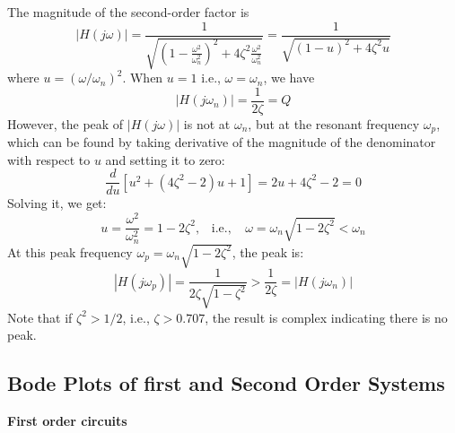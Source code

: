 \documentclass{article}
\begin{document}
  The magnitude of the second-order factor is
  \begin{equation}
    |H(j\omega)|
    =\frac{1}{\sqrt{(1-\frac{\omega^2}{\omega_n^2})^2+4\zeta^2 \frac{\omega^2}{\omega_n^2}}}
    =\frac{1}{\sqrt{(1-u)^2+4\zeta^2 u}} 
  \end{equation}
  where $u=(\omega/\omega_n)^2$. When $u=1$ i.e., $\omega=\omega_n$, we have
  \begin{equation} 
    | H(j\omega_n) |=\frac{1}{2\zeta}=Q 
  \end{equation}
  However, the peak of $|H(j\omega)|$ is not at $\omega_n$, but at the resonant frequency 
  $\omega_p$, which can be found by taking derivative of the magnitude of the denominator 
  with respect to $u$ and setting it to zero:
  \begin{equation} 
    \frac{d}{du}[u^2+(4\zeta^2-2)u+1]=2u+4\zeta^2-2=0 
  \end{equation}
  Solving it, we get:
  \begin{equation} 
    u=\frac{\omega^2}{\omega_n^2}=1-2\zeta^2,\;\;\;\mbox{i.e.,}
    \;\;\;\;\omega=\omega_n\sqrt{1-2\zeta^2} < \omega_n 
  \end{equation}
  At this peak frequency $\omega_p=\omega_n\sqrt{1-2\zeta^2}$, the peak is:
  \begin{equation} 
    | H(j\omega_p) |=\frac{1}{2\zeta\sqrt{1-\zeta^2}} > \frac{1}{2\zeta}=| H(j\omega_n) | 
  \end{equation}
  Note that if $\zeta^2>1/2$, i.e., $\zeta>0.707$, the result is complex indicating there 
  is no peak.


\subsection*{Bode Plots of first and Second Order Systems}
{\bf First order circuits}

\end{document}
